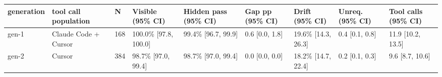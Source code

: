\begin{tabular}{lllllllll}
\toprule
generation & tool call population & N & Visible (95\% CI) & Hidden pass (95\% CI) & Gap pp (95\% CI) & Drift (95\% CI) & Unreq. (95\% CI) & Tool calls (95\% CI) \\
\midrule
gen-1 & Claude Code + Cursor & 168 & 100.0\% [97.8, 100.0] & 99.4\% [96.7, 99.9] & 0.6 [0.0, 1.8] & 19.6\% [14.3, 26.3] & 0.4 [0.1, 0.8] & 11.9 [10.2, 13.5] \\
gen-2 & Cursor & 384 & 98.7\% [97.0, 99.4] & 98.7\% [97.0, 99.4] & 0.0 [0.0, 0.0] & 18.2\% [14.7, 22.4] & 0.2 [0.1, 0.3] & 9.6 [8.7, 10.6] \\
\bottomrule
\end{tabular}
